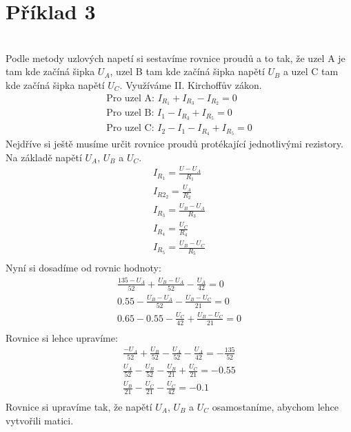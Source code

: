 \section{Příklad 3}
	\\Podle metody uzlových napetí si sestavíme rovnice proudů a to tak, že uzel A je tam kde začíná šipka ${U_A}$, uzel B tam kde začíná šipka napětí ${U_B}$ a uzel C tam kde začíná šipka napětí ${U_C}$. Využíváme II. Kirchoffův zákon.
	\begin{gather*}
		\text{Pro uzel A: }
		I_{R_{1}} + I_{R_{3}} - I_{R_{2}} = 0 \\
		\text{Pro uzel B: }
		I_{1} - I_{R_{3}} + I_{R_{5}} = 0 \\
		\text{Pro uzel C: }
		I_{2} - I_{1} - I_{R_{4}} + I_{R_{5}} = 0
	\end{gather*}
	Nejdříve si ještě musíme určit rovnice proudů protékající jednotlivými rezistory. Na základě napětí ${U_A}$, ${U_B}$ a ${U_C}$.
	\begin{gather*}
		I_{R_{1}} =\frac{U - U_A}{R_1}\\
        I_{R2_{2}} =\frac{U_A}{R_2}\\
        I_{R_{3}} =\frac{U_B - U_A}{R_3}\\
        I_{R_{4}} =\frac{U_C}{R_4}\\
        I_{R_{5}} =\frac{U_B - U_C}{R_5}\\
	\end{gather*}
    Nyní si dosadíme od rovnic hodnoty:
    \begin{gather*}
		\frac{135 - U_A}{52} + \frac{U_B - U_A}{52} - \frac{U_A}{42} = 0\\
        0.55 - \frac{U_B - U_A}{52} - \frac{U_B - U_C}{21} = 0\\
        0.65 - 0.55 - \frac{U_C}{42} + \frac{U_B - U_C}{21} = 0\\
	\end{gather*}
	Rovnice si lehce upravíme: 
    \begin{gather*}
		\frac{-U_A}{52} + \frac{U_B}{52} - \frac{U_A}{52} - \frac{U_A}{42} = -\frac{135}{52}\\
        \frac{U_A}{52} - \frac{U_B}{52} - \frac{U_B}{21} + \frac{U_C}{21} = -0.55\\
        \frac{U_B}{21} - \frac{U_C}{21} - \frac{U_C}{42} = -0.1\\
	\end{gather*}
    Rovnice si upravíme tak, že napětí ${U_A}$, ${U_B}$ a ${U_C}$ osamostaníme, abychom lehce vytvořili matici.
